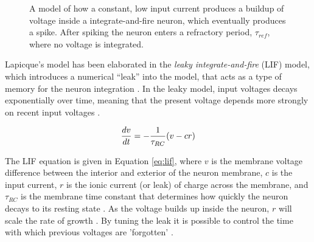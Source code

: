 \documentclass[report.tex]{subfiles}
\begin{document}
\begin{figure}
\centering

\caption{A model of how a constant, low input current produces a buildup of
	voltage inside a integrate-and-fire neuron, which eventually produces a spike.
	After spiking the neuron enters a refractory period, $\tau_{ref}$,
   	where no voltage is integrated.}
\label{fig:spiking}
\end{figure}

Lapicque's model has been elaborated in the \textit{leaky
integrate-and-fire} (LIF) 
model, which introduces a numerical ``leak''
into the model, that acts as a type of memory 
for the neuron integration \cite{Eliasmith2004, Eliasmith2015}.
In the leaky model, input voltages decays exponentially over time,
meaning that the present voltage depends more strongly on recent input
voltages \cite[p. 85]{Eliasmith2004}.

\begin{equation}
  \frac{dv}{dt} = - {1 \over \tau_{RC}} (v - cr)
  \label{eq:lif}
\end{equation}

The LIF equation is given in Equation \ref{eq:lif}, where
$v$ is the membrane voltage difference between the interior
and exterior of the neuron membrane, $c$ is the input current, $r$
is the ionic current (or leak) of charge across the membrane, and
$\tau_{RC}$ is the membrane time constant that determines how
quickly the neuron decays to its resting state \cite{Dayan2001, Eliasmith2004}.
As the voltage builds up inside the neuron, $r$ will scale the
rate of growth \cite{Eliasmith2004}.
By tuning the leak it is possible to control the time with which
previous voltages are 'forgotten' \cite{Eliasmith2004}.
\end{document}
